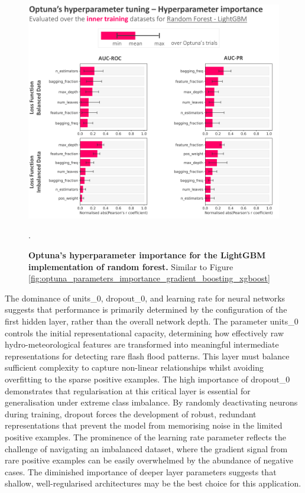 \begin{figure}[htbp]
\centering
\includegraphics[scale=0.9]{optuna_parameters_importance_random_forest_lightgbm.png}
\caption{\textbf{Optuna's hyperparameter importance for the LightGBM implementation of random forest.} Similar to Figure \ref{fig:optuna_parameters_importance_gradient_boosting_xgboost}}.
\label{fig:optuna_parameters_importance_random_forest_lightgbm}
\end{figure}

The  dominance of units\_0, dropout\_0, and learning rate for neural networks suggests that performance is primarily determined by the configuration of the first hidden layer, rather than the overall network depth. The parameter units\_0 controls the initial representational capacity, determining how effectively raw hydro-meteorological features are transformed into meaningful intermediate representations for detecting rare flash flood patterns. This layer must balance sufficient complexity to capture non-linear relationships whilst avoiding overfitting to the sparse positive examples. The high importance of dropout\_0 demonstrates that regularisation at this critical layer is essential for generalisation under extreme class imbalance. By randomly deactivating neurons during training, dropout forces the development of robust, redundant representations that prevent the model from memorising noise in the limited positive examples. The prominence of the learning rate parameter reflects the challenge of navigating an imbalanced dataset, where the gradient signal from rare positive examples can be easily overwhelmed by the abundance of negative cases. The diminished importance of deeper layer parameters suggests that shallow, well-regularised architectures may be the best choice for this application.

